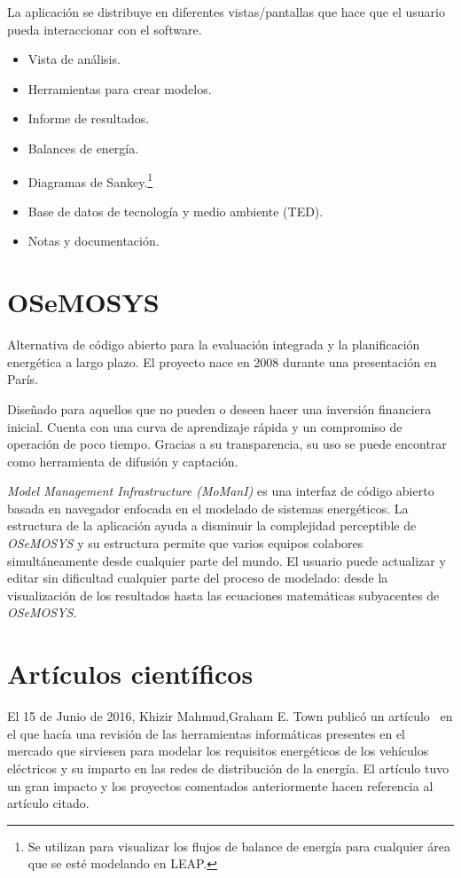 La aplicación se distribuye en diferentes vistas/pantallas que hace que el usuario pueda interaccionar con el software.

\begin{itemize}
	\item Vista de análisis.
	\item Herramientas para crear modelos.
	\item Informe de resultados.
	\item Balances de energía.
	\item Diagramas de Sankey.\footnote{Se utilizan para visualizar los flujos de balance de energía para cualquier área que se esté modelando en LEAP.}
	\item Base de datos de tecnología y medio ambiente (TED).
	\item Notas y documentación.
\end{itemize}

\section{OSeMOSYS}

Alternativa de código abierto para la evaluación integrada y la planificación energética a largo plazo. El proyecto nace en 2008 durante una presentación en París.

Diseñado para aquellos que no pueden o deseen hacer una inversión financiera inicial. Cuenta con una curva de aprendizaje rápida y un compromiso de operación de poco tiempo. Gracias a su transparencia, su uso se puede encontrar como herramienta de difusión y captación.

\textit{Model Management Infrastructure (MoManI)} es una interfaz de código abierto basada en navegador enfocada en el modelado de sistemas energéticos. La estructura de la aplicación ayuda a disminuir la complejidad perceptible de \textit{OSeMOSYS} y su estructura permite que varios equipos colabores simultáneamente desde cualquier parte del mundo.
El usuario puede actualizar y editar sin dificultad cualquier parte del proceso de modelado: desde la visualización de los resultados hasta las ecuaciones matemáticas subyacentes de \textit{OSeMOSYS}.

\section{Artículos científicos}

El 15 de Junio de 2016, Khizir Mahmud,Graham E. Town publicó un artículo~\cite{pdf:articuloAplicacionesRelacionadas} en el que hacía una revisión de las herramientas informáticas presentes en el mercado que sirviesen para modelar los requisitos energéticos de los vehículos eléctricos y su imparto en las redes de distribución de la energía. El artículo tuvo un gran impacto y los proyectos comentados anteriormente hacen referencia al artículo citado. 


